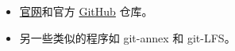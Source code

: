 
\begin{issues}
\issueDraft
\end{issues}

\begin{itemize}
\item \href{https://bup.github.io/}{官网}和官方 \href{https://github.com/bup/bup}{GitHub} 仓库。
\item 另一些类似的程序如 git-annex 和 git-LFS。
\end{itemize}
